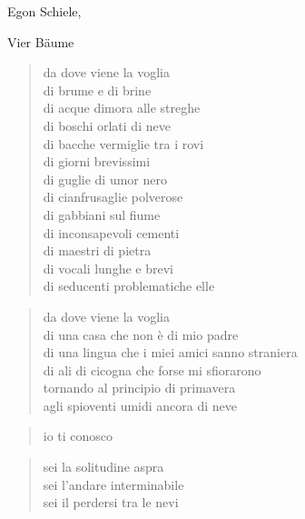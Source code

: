 \begin{volumetitlepage}
\end{volumetitlepage}


\begin{artItem}
	Egon Schiele, \begin{otherlanguage}{german}%
		Vier Bäume%
	\end{otherlanguage}
\end{artItem}

	\begin{verse}
		da dove viene la voglia\\
		di brume e di brine\\
		di acque dimora alle streghe\\
		di boschi orlati di neve\\
		di bacche vermiglie tra i rovi\\
		di giorni brevissimi\\
		di guglie di umor nero\\
		di cianfrusaglie polverose\\
		di gabbiani sul fiume\\
		di inconsapevoli cementi\\
		di maestri di pietra\\
		di vocali lunghe e brevi\\
		di seducenti problematiche elle
	\end{verse}

	\begin{verse}
		da dove viene la voglia\\
		di una casa che non è di mio padre\\
		di una lingua che i miei amici sanno straniera\\
		di ali di cicogna che forse mi sfiorarono\\
		tornando al principio di primavera\\
		agli spioventi umidi ancora di neve
	\end{verse}

\clearpage


	\begin{verse}
		io ti conosco
	\end{verse}

	\begin{verse}
		sei la solitudine aspra\\
		sei l’andare interminabile\\
		sei il perdersi tra le nevi
	\end{verse}

